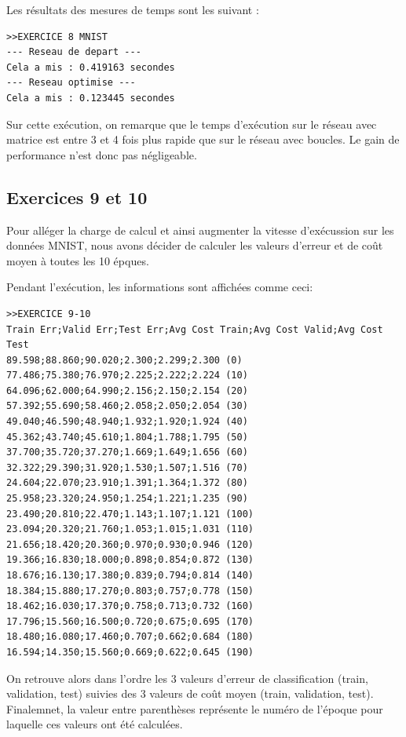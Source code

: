 \documentclass[a4paper,11pt]{article}
\begin{document}
Les résultats des mesures de temps sont les suivant : 

\begin{verbatim}
>>EXERCICE 8 MNIST
--- Reseau de depart ---
Cela a mis : 0.419163 secondes
--- Reseau optimise ---
Cela a mis : 0.123445 secondes
\end{verbatim}

Sur cette exécution, on remarque que le temps d'exécution sur le réseau avec matrice est entre 3 et 4 fois plus rapide que sur le réseau avec boucles. Le gain de performance n'est donc pas négligeable.

\subsection{Exercices 9 et 10}

Pour alléger la charge de calcul et ainsi augmenter la vitesse d'exécussion sur les données MNIST, nous avons décider de calculer les valeurs d'erreur et de coût moyen à toutes les 10 épques.

Pendant l'exécution, les informations sont affichées comme ceci:

\begin{verbatim}
>>EXERCICE 9-10
Train Err;Valid Err;Test Err;Avg Cost Train;Avg Cost Valid;Avg Cost Test
89.598;88.860;90.020;2.300;2.299;2.300 (0)
77.486;75.380;76.970;2.225;2.222;2.224 (10)
64.096;62.000;64.990;2.156;2.150;2.154 (20)
57.392;55.690;58.460;2.058;2.050;2.054 (30)
49.040;46.590;48.940;1.932;1.920;1.924 (40)
45.362;43.740;45.610;1.804;1.788;1.795 (50)
37.700;35.720;37.270;1.669;1.649;1.656 (60)
32.322;29.390;31.920;1.530;1.507;1.516 (70)
24.604;22.070;23.910;1.391;1.364;1.372 (80)
25.958;23.320;24.950;1.254;1.221;1.235 (90)
23.490;20.810;22.470;1.143;1.107;1.121 (100)
23.094;20.320;21.760;1.053;1.015;1.031 (110)
21.656;18.420;20.360;0.970;0.930;0.946 (120)
19.366;16.830;18.000;0.898;0.854;0.872 (130)
18.676;16.130;17.380;0.839;0.794;0.814 (140)
18.384;15.880;17.270;0.803;0.757;0.778 (150)
18.462;16.030;17.370;0.758;0.713;0.732 (160)
17.796;15.560;16.500;0.720;0.675;0.695 (170)
18.480;16.080;17.460;0.707;0.662;0.684 (180)
16.594;14.350;15.560;0.669;0.622;0.645 (190)
\end{verbatim}

On retrouve alors dans l'ordre les 3 valeurs d'erreur de classification (train, validation, test) suivies des 3 valeurs de coût moyen (train, validation, test). Finalemnet, la valeur entre parenthèses représente le numéro de l'époque pour laquelle ces valeurs ont été calculées.
\end{document}
